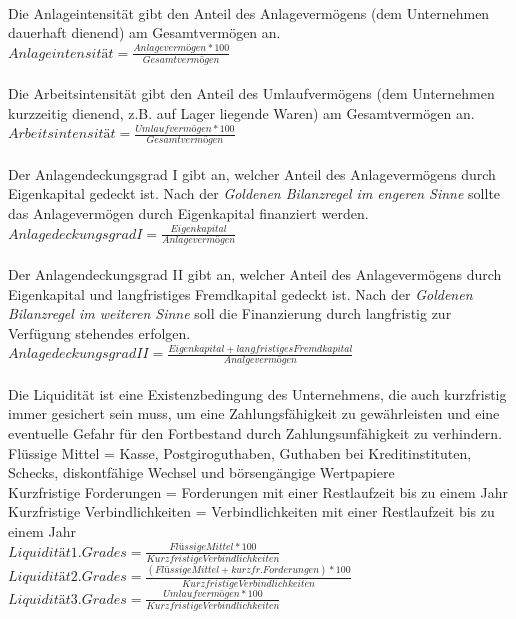 \\
Die Anlageintensität gibt den Anteil des Anlagevermögens (dem Unternehmen dauerhaft dienend) am Gesamtvermögen an.\\
$Anlageintensität = \frac{Anlagevermögen * 100}{Gesamtvermögen}$\\
\\
Die Arbeitsintensität gibt den Anteil des Umlaufvermögens (dem Unternehmen kurzzeitig dienend, z.B. auf Lager liegende Waren) am Gesamtvermögen an.\\
$Arbeitsintensität = \frac{Umlaufvermögen * 100}{Gesamtvermögen}$\\
\\
Der Anlagendeckungsgrad I gibt an, welcher Anteil des Anlagevermögens durch Eigenkapital gedeckt ist. Nach der {\it Goldenen Bilanzregel im engeren Sinne} sollte das Anlagevermögen durch Eigenkapital finanziert werden.\\
$Anlagedeckungsgrad I = \frac{Eigenkapital}{Anlagevermögen}$\\
\\
Der Anlagendeckungsgrad II gibt an, welcher Anteil des Anlagevermögens durch Eigenkapital und langfristiges Fremdkapital gedeckt ist. Nach der {\it Goldenen Bilanzregel im weiteren Sinne} soll die Finanzierung durch langfristig zur Verfügung stehendes erfolgen.\\
$Anlagedeckungsgrad II = \frac{Eigenkapital + langfristiges Fremdkapital}{Analgevermögen}$\\
\\
Die Liquidität ist eine Existenzbedingung des Unternehmens, die auch kurzfristig immer gesichert sein muss, um eine Zahlungsfähigkeit zu gewährleisten und eine eventuelle Gefahr für den Fortbestand durch Zahlungsunfähigkeit zu verhindern.\\
Flüssige Mittel = Kasse, Postgiroguthaben, Guthaben bei Kreditinstituten, Schecks, diskontfähige Wechsel und börsengängige Wertpapiere\\
Kurzfristige Forderungen = Forderungen mit einer Restlaufzeit bis zu einem Jahr\\
Kurzfristige Verbindlichkeiten = Verbindlichkeiten mit einer Restlaufzeit bis zu einem Jahr\\

$Liquidität 1. Grades = \frac{Flüssige Mittel * 100}{Kurzfristige Verbindlichkeiten}$\\
$Liquidität 2. Grades = \frac{(Flüssige Mittel + kurzfr. Forderungen) * 100}{Kurzfristige Verbindlichkeiten}$\\
$Liquidität 3. Grades = \frac{Umlaufvermögen * 100}{Kurzfristige Verbindlichkeiten}$\\

